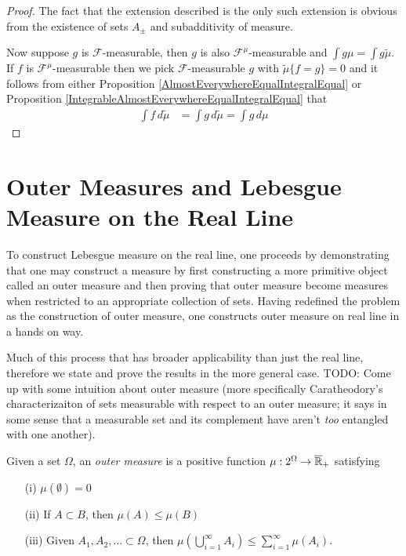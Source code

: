 \begin{proof}
The fact that the extension described is the only such extension is obvious from the existence of sets $A_\pm$ and subadditivity of measure.

Now suppose $g$ is $\mathcal{F}$-measurable, then $g$ is also $\mathcal{F}^\mu$-measurable and $\int g \mu = \int g \tilde{\mu}$.  If $f$ is $\mathcal{F}^\mu$-measurable then we pick $\mathcal{F}$-measurable $g$ with $\tilde{\mu}\lbrace f = g \rbrace = 0$ and it follows from either 
Proposition \ref{AlmostEverywhereEqualIntegralEqual} or Proposition \ref{IntegrableAlmostEverywhereEqualIntegralEqual} that
\begin{align*}
\int f \, d \tilde{\mu} &= \int g \, d \tilde{\mu} = \int g \, d \mu
\end{align*}
\end{proof}

\section{Outer Measures and Lebesgue Measure on the Real Line}
To construct Lebesgue measure on the real line, one proceeds by
demonstrating that one may construct a measure by first constructing a more
primitive object called an outer measure and then proving that outer
measure become measures when restricted to an appropriate collection
of sets.  Having redefined the problem as the construction of outer
measure, one constructs outer measure on real line in a hands on way.

Much of this process that has broader applicability than just the real line,  therefore we state and prove the results
in the more general case.
TODO: Come up with some intuition about outer measure (more
specifically Caratheodory's characterizaiton of sets measurable with
respect to an outer measure; it says in some sense that a measurable
set and its complement have aren't \emph{too} entangled with one another).
\begin{defn}Given a set $\Omega$, an \emph{outer measure} is a
positive  function $\mu : 2^\Omega \to \overline{\mathbb{R}}_+$ satisfying
\begin{itemize}
\item[(i)] $\mu(\emptyset) = 0$
\item[(ii)] If $A \subset B$, then $\mu(A) \leq \mu(B)$
\item[(iii)] Given $A_1, A_2, \dots \subset \Omega$, then $\mu \left
    (\bigcup_{i=1}^\infty A_i \right ) \leq \sum_{i=1}^\infty \mu(A_i)$.
\end{itemize}
\end{defn}

